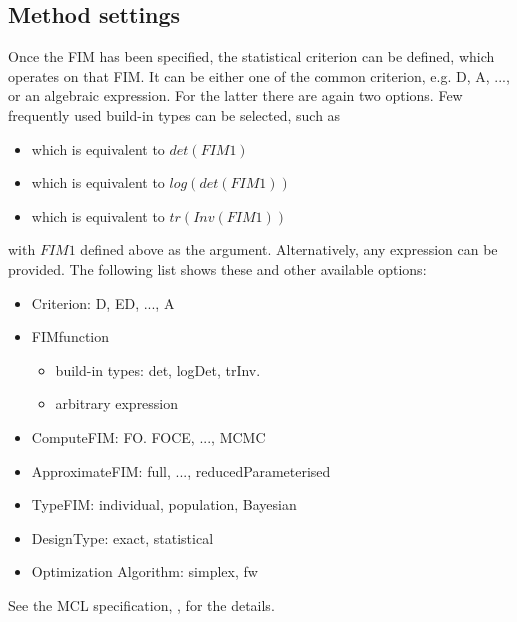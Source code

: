 \subsection{Method settings}
Once the FIM has been specified, the statistical criterion can be defined, which 
operates on that FIM. It can be either one of the common criterion, e.g. D, A, ...,
or an algebraic expression. For the latter there are again two options. Few 
frequently used build-in types can be selected, such as
\begin{itemize}
\item 
{} which is equivalent to $det(FIM1)$
\item 
{} which is equivalent to $log(det(FIM1))$
\item 
{} which is equivalent to $tr(Inv(FIM1))$
\end{itemize}
with $FIM1$ defined above as the argument. Alternatively, any expression
can be provided. The following list shows these and other available options:
\begin{itemize}
\item 
Criterion: D, ED, ..., A
\item 
FIMfunction
\begin{itemize}
\item 
build-in types: det, logDet, trInv.
\item 
arbitrary expression
\end{itemize}
\item 
    ComputeFIM: FO. FOCE, ..., MCMC
\item 
    ApproximateFIM: full, ..., reducedParameterised
\item 
    TypeFIM: individual, population, Bayesian 
\item 
    DesignType: exact, statistical
\item 
    Optimization Algorithm: simplex, fw
\end{itemize}
See the MCL specification,  \cite{Commets2015, CommetsExamples2015}, for 
the details.

